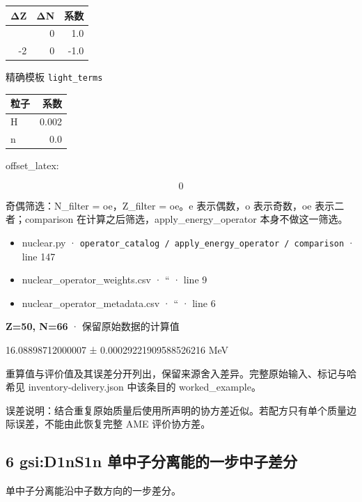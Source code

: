 \documentclass[
  11pt,
  letterpaper,
]{article}
\providecommand{\tightlist}{%
  \setlength{\itemsep}{0pt}\setlength{\parskip}{0pt}}
\begin{document}
\begin{longtable}[]{@{}rrr@{}}
\toprule\noalign{}
ΔZ & ΔN & 系数 \\
\midrule\noalign{}
\endhead
\bottomrule\noalign{}
\endlastfoot
0 & 0 & 1.0 \\
-2 & 0 & -1.0 \\
\end{longtable}

精确模板 \texttt{light\_terms}

\begin{longtable}[]{@{}lr@{}}
\toprule\noalign{}
粒子 & 系数 \\
\midrule\noalign{}
\endhead
\bottomrule\noalign{}
\endlastfoot
H & 0.002 \\
n & 0.0 \\
\end{longtable}

offset\_latex:

\[
0
\]

奇偶筛选：N\_filter = oe，Z\_filter = oe。e 表示偶数，o 表示奇数，oe
表示二者；comparison 在计算之后筛选，apply\_energy\_operator
本身不做这一筛选。

\begin{itemize}
\tightlist
\item
  nuclear.py ·
  \texttt{operator\_catalog\ /\ apply\_energy\_operator\ /\ comparison}
  · line 147
\item
  nuclear\_operator\_weights.csv · `` · line 9
\item
  nuclear\_operator\_metadata.csv · `` · line 6
\end{itemize}

\textbf{Z=50, N=66} · 保留原始数据的计算值

16.08898712000007 ± 0.00029221909588526216 MeV

重算值与评价值及其误差分开列出，保留来源舍入差异。完整原始输入、标记与哈希见
inventory-delivery.json 中该条目的 worked\_example。

误差说明：结合重复原始质量后使用所声明的协方差近似。若配方只有单个质量边际误差，不能由此恢复完整
AME 评价协方差。

\subsection{6 gsi:D1nS1n
单中子分离能的一步中子差分}\label{gsid1ns1n-ux5355ux4e2dux5b50ux5206ux79bbux80fdux7684ux4e00ux6b65ux4e2dux5b50ux5deeux5206}

单中子分离能沿中子数方向的一步差分。
\end{document}
